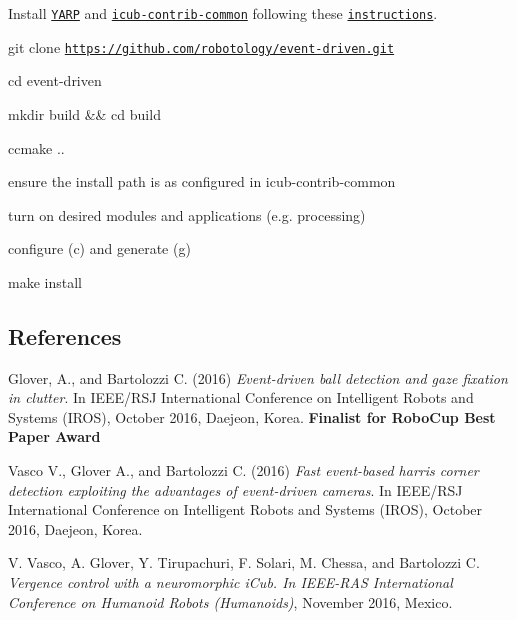 \begin{DoxyEnumerate}
\item Install \href{https://github.com/robotology/yarp}{\tt Y\+A\+RP} and \href{https://github.com/robotology/icub-contrib-common}{\tt icub-\/contrib-\/common} following these \href{http://wiki.icub.org/wiki/Linux:Installation_from_sources}{\tt instructions}.
\item git clone \href{https://github.com/robotology/event-driven.git}{\tt https\+://github.\+com/robotology/event-\/driven.\+git}
\item cd event-\/driven
\item mkdir build \&\& cd build
\item ccmake ..
\item ensure the install path is as configured in icub-\/contrib-\/common
\item turn on desired modules and applications (e.\+g. processing)
\item configure (c) and generate (g)
\item make install
\end{DoxyEnumerate}

\subsection*{References}

Glover, A., and Bartolozzi C. (2016) {\itshape Event-\/driven ball detection and gaze fixation in clutter}. In I\+E\+E\+E/\+R\+SJ International Conference on Intelligent Robots and Systems (I\+R\+OS), October 2016, Daejeon, Korea. {\bfseries Finalist for Robo\+Cup Best Paper Award}

Vasco V., Glover A., and Bartolozzi C. (2016) {\itshape Fast event-\/based harris corner detection exploiting the advantages of event-\/driven cameras}. In I\+E\+E\+E/\+R\+SJ International Conference on Intelligent Robots and Systems (I\+R\+OS), October 2016, Daejeon, Korea.

V. Vasco, A. Glover, Y. Tirupachuri, F. Solari, M. Chessa, and Bartolozzi C. {\itshape Vergence control with a neuromorphic i\+Cub. In I\+E\+E\+E-\/\+R\+AS International Conference on Humanoid Robots (Humanoids)}, November 2016, Mexico. 